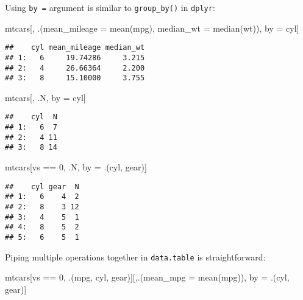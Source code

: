 \documentclass[
]{book}
\newenvironment{Shaded}{\begin{snugshade}}{\end{snugshade}}
\newcommand{\AttributeTok}[1]{\textcolor[rgb]{0.77,0.63,0.00}{#1}}
\newcommand{\DecValTok}[1]{\textcolor[rgb]{0.00,0.00,0.81}{#1}}
\newcommand{\FunctionTok}[1]{\textcolor[rgb]{0.00,0.00,0.00}{#1}}
\newcommand{\NormalTok}[1]{#1}
\newcommand{\OtherTok}[1]{\textcolor[rgb]{0.56,0.35,0.01}{#1}}
\newcommand{\SpecialCharTok}[1]{\textcolor[rgb]{0.00,0.00,0.00}{#1}}
\begin{document}
Using \texttt{by\ =} argument is similar to \texttt{group\_by()} in \texttt{dplyr}:

\begin{Shaded}
\begin{Highlighting}[]
\NormalTok{mtcars[, .(}\AttributeTok{mean\_mileage =} \FunctionTok{mean}\NormalTok{(mpg), }\AttributeTok{median\_wt =} \FunctionTok{median}\NormalTok{(wt)), by }\OtherTok{=}\NormalTok{ cyl]}
\end{Highlighting}
\end{Shaded}

\begin{verbatim}
##    cyl mean_mileage median_wt
## 1:   6     19.74286     3.215
## 2:   4     26.66364     2.200
## 3:   8     15.10000     3.755
\end{verbatim}

\begin{Shaded}
\begin{Highlighting}[]
\NormalTok{mtcars[, .N, by }\OtherTok{=}\NormalTok{ cyl]}
\end{Highlighting}
\end{Shaded}

\begin{verbatim}
##    cyl  N
## 1:   6  7
## 2:   4 11
## 3:   8 14
\end{verbatim}

\begin{Shaded}
\begin{Highlighting}[]
\NormalTok{mtcars[vs }\SpecialCharTok{==} \DecValTok{0}\NormalTok{, .N, by }\OtherTok{=}\NormalTok{ .(cyl, gear)]}
\end{Highlighting}
\end{Shaded}

\begin{verbatim}
##    cyl gear  N
## 1:   6    4  2
## 2:   8    3 12
## 3:   4    5  1
## 4:   8    5  2
## 5:   6    5  1
\end{verbatim}

Piping multiple operations together in \texttt{data.table} is straightforward:

\begin{Shaded}
\begin{Highlighting}[]
\NormalTok{mtcars[vs }\SpecialCharTok{==} \DecValTok{0}\NormalTok{, .(mpg, cyl, gear)][,.(}\AttributeTok{mean\_mpg =} \FunctionTok{mean}\NormalTok{(mpg)), by }\OtherTok{=}\NormalTok{ .(cyl, gear)]}
\end{Highlighting}
\end{Shaded}
\end{document}
